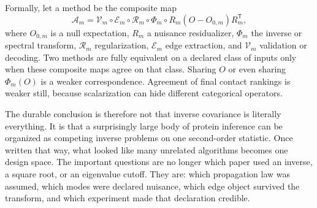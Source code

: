 Formally, let a method be the composite map
\begin{equation}
\mathcal A_m
=\mathcal V_m\circ\mathcal E_m\circ\mathcal R_m\circ
\Phi_m\circ R_m(O-O_{0,m})R_m^{\mathsf T},
\label{eq:composite-inverse-graph-method}
\end{equation}
where $O_{0,m}$ is a null expectation, $R_m$ a nuisance residualizer, $\Phi_m$ the inverse or
spectral transform, $\mathcal R_m$ regularization, $\mathcal E_m$ edge extraction, and
$\mathcal V_m$ validation or decoding.  Two methods are fully equivalent on a declared class of
inputs only when these composite maps agree on that class.  Sharing $O$ or even sharing
$\Phi_m(O)$ is a weaker correspondence.  Agreement of final contact rankings is weaker still,
because scalarization can hide different categorical operators.

The durable conclusion is therefore not that inverse covariance is literally everything.  It is
that a surprisingly large body of protein inference can be organized as competing inverse
problems on one second-order statistic.  Once written that way, what looked like many unrelated
algorithms becomes one design space.  The important questions are no longer which paper used an
inverse, a square root, or an eigenvalue cutoff.  They are: which propagation law was assumed,
which modes were declared nuisance, which edge object survived the transform, and which experiment
made that declaration credible.
